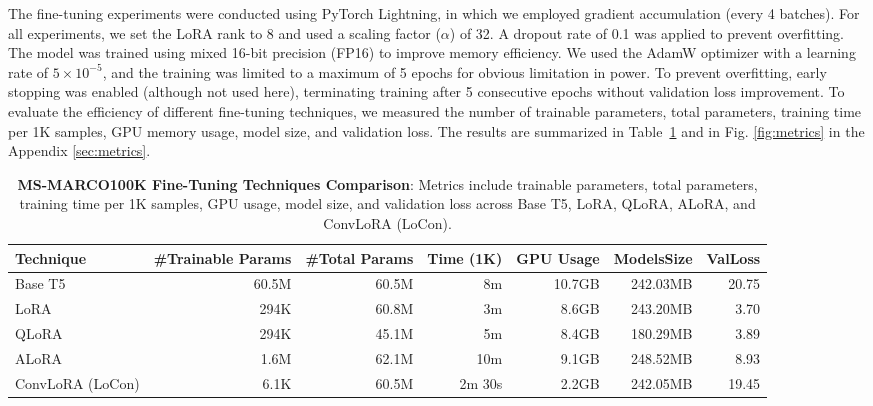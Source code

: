The fine-tuning experiments were conducted using PyTorch Lightning, in which we employed gradient accumulation (every 4 batches). For all experiments, we set the LoRA rank to 8 and used a scaling factor (\(\alpha\)) of 32. A dropout rate of 0.1 was applied to prevent overfitting. The model was trained using mixed 16-bit precision (FP16) to improve memory efficiency. We used the AdamW optimizer with a learning rate of \(5 \times 10^{-5}\), and the training was limited to a maximum of 5 epochs for obvious limitation in power. To prevent overfitting, early stopping was enabled (although not used here), terminating training after 5 consecutive epochs without validation loss improvement. 
To evaluate the efficiency of different fine-tuning techniques, we measured the number of trainable parameters, total parameters, training time per 1K samples, GPU memory usage, model size, and validation loss. The results are summarized in Table~\ref{tab:results_comparison} and in Fig. \ref{fig:metrics} in the Appendix \ref{sec:metrics}.

\begin{table}[ht]
    \centering
    \small
    \begin{tabular}{l|rrrrrr}
    \toprule
    \textbf{Technique} & \textbf{\#Trainable Params} & \textbf{\#Total Params} & \textbf{Time (1K)} & \textbf{GPU Usage} & \textbf{ModelsSize} & \textbf{ValLoss} \\
    \midrule
    Base T5         & 60.5M & 60.5M & 8m & 10.7GB & 242.03MB & 20.75\\
    LoRA            & 294K & 60.8M & 3m & 8.6GB & 243.20MB & 3.70\\
    QLoRA           & 294K & 45.1M & 5m & 8.4GB & 180.29MB & 3.89\\
    ALoRA           & 1.6M & 62.1M & 10m & 9.1GB & 248.52MB & 8.93\\
    ConvLoRA (LoCon)& 6.1K & 60.5M & 2m 30s & 2.2GB & 242.05MB & 19.45\\
    \bottomrule
    \end{tabular}
    \caption{\textbf{MS-MARCO100K Fine-Tuning Techniques Comparison}: Metrics include trainable parameters, total parameters, training time per 1K samples, GPU usage, model size, and validation loss across Base T5, LoRA, QLoRA, ALoRA, and ConvLoRA (LoCon).}
    \label{tab:results_comparison}
\end{table}

